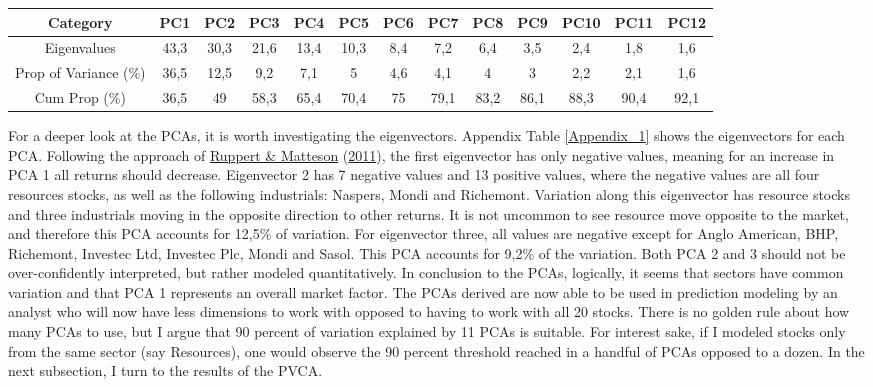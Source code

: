 \documentclass[11pt,preprint, authoryear]{elsarticle}
\let\origtable\table
\let\endorigtable\endtable
\renewenvironment{table}[1][2] {
    \expandafter\origtable\expandafter[H]
} {
    \endorigtable
}
\numberwithin{equation}{section}
\numberwithin{figure}{section}
\numberwithin{table}{section}
\begin{document}
\begin{table}[h!]
\centering
\begin{tabular}{|c c c c c c c c c c c c c|}
\hline
Category & PC1 & PC2 & PC3 & PC4 & PC5 & PC6 & PC7 & PC8 & PC9 & PC10 & PC11 & PC12 \\
\hline\hline 
Eigenvalues & 43,3 & 30,3 & 21,6 & 13,4 & 10,3 & 8,4 & 7,2 & 6,4 & 3,5 & 2,4 & 1,8 & 1,6 \\
Prop of Variance (\%) & 36,5 & 12,5 & 9,2 & 7,1 & 5 & 4,6 & 4,1 & 4 & 3 & 2,2 & 2,1 & 1,6 \\
Cum Prop (\%) & 36,5 & 49 & 58,3 & 65,4 & 70,4 & 75 & 79,1 & 83,2 & 86,1 & 88,3 & 90,4 & 92,1 \\ 
\hline
\end{tabular}
\caption{Importance of PCAs}\label{Table_1}
\end{table}

For a deeper look at the PCAs, it is worth investigating the
eigenvectors. Appendix Table \ref{Appendix_1} shows the eigenvectors for
each PCA. Following the approach of
\protect\hyperlink{ref-ruppert}{Ruppert \& Matteson}
(\protect\hyperlink{ref-ruppert}{2011}), the first eigenvector has only
negative values, meaning for an increase in PCA 1 all returns should
decrease. Eigenvector 2 has 7 negative values and 13 positive values,
where the negative values are all four resources stocks, as well as the
following industrials: Naspers, Mondi and Richemont. Variation along
this eigenvector has resource stocks and three industrials moving in the
opposite direction to other returns. It is not uncommon to see resource
move opposite to the market, and therefore this PCA accounts for 12,5\%
of variation. For eigenvector three, all values are negative except for
Anglo American, BHP, Richemont, Investec Ltd, Investec Plc, Mondi and
Sasol. This PCA accounts for 9,2\% of the variation. Both PCA 2 and 3
should not be over-confidently interpreted, but rather modeled
quantitatively. In conclusion to the PCAs, logically, it seems that
sectors have common variation and that PCA 1 represents an overall
market factor. The PCAs derived are now able to be used in prediction
modeling by an analyst who will now have less dimensions to work with
opposed to having to work with all 20 stocks. There is no golden rule
about how many PCAs to use, but I argue that 90 percent of variation
explained by 11 PCAs is suitable. For interest sake, if I modeled stocks
only from the same sector (say Resources), one would observe the 90
percent threshold reached in a handful of PCAs opposed to a dozen. In
the next subsection, I turn to the results of the PVCA.
\end{document}
